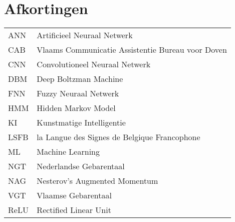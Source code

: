 \chapter{Afkortingen}

\renewcommand{\baselinestretch}{1.5}
\small\normalsize
\begin{longtable}{ll}
	ANN & Artificieel Neuraal Netwerk \\
	CAB & Vlaams Communicatie Assistentie Bureau voor Doven \\
	CNN & Convolutioneel Neuraal Netwerk \\
	DBM & Deep Boltzman Machine \\
	FNN & Fuzzy Neuraal Netwerk \\
	HMM & Hidden Markov Model \\
	KI & Kunstmatige Intelligentie\\
	LSFB & la Langue des Signes de Belgique Francophone \\
	ML & Machine Learning \\
	NGT & Nederlandse Gebarentaal \\
	NAG & Nesterov's Augmented Momentum \\
	VGT & Vlaamse Gebarentaal \\	
	ReLU & Rectified Linear Unit\\
	
	
	
	
\end{longtable}
